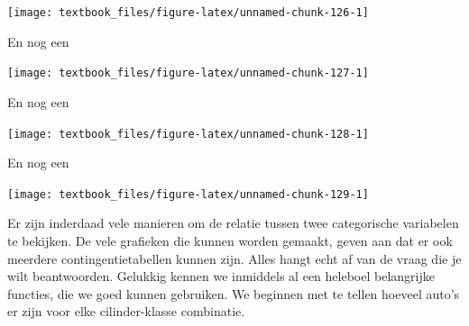 \documentclass[]{tufte-book}
\newenvironment{Shaded}{}{}
\newcommand{\DataTypeTok}[1]{\textcolor[rgb]{0.56,0.13,0.00}{#1}}
\newcommand{\KeywordTok}[1]{\textcolor[rgb]{0.00,0.44,0.13}{\textbf{#1}}}
\newcommand{\NormalTok}[1]{#1}
\newcommand{\OperatorTok}[1]{\textcolor[rgb]{0.40,0.40,0.40}{#1}}
\newcommand{\StringTok}[1]{\textcolor[rgb]{0.25,0.44,0.63}{#1}}
\begin{document}
\texttt{[image: textbook\_files/figure-latex/unnamed-chunk-126-1]}

En nog een

\begin{Shaded}
\end{Shaded}

\texttt{[image: textbook\_files/figure-latex/unnamed-chunk-127-1]}

En nog een

\begin{Shaded}
\end{Shaded}

\texttt{[image: textbook\_files/figure-latex/unnamed-chunk-128-1]}

En nog een

\begin{Shaded}
\end{Shaded}

\texttt{[image: textbook\_files/figure-latex/unnamed-chunk-129-1]}

Er zijn inderdaad vele manieren om de relatie tussen twee categorische variabelen te bekijken. De vele grafieken die kunnen worden gemaakt, geven aan dat er ook meerdere contingentietabellen kunnen zijn. Alles hangt echt af van de vraag die je wilt beantwoorden. Gelukkig kennen we inmiddels al een heleboel belangrijke functies, die we goed kunnen gebruiken. We beginnen met te tellen hoeveel auto's er zijn voor elke cilinder-klasse combinatie.
\end{document}

